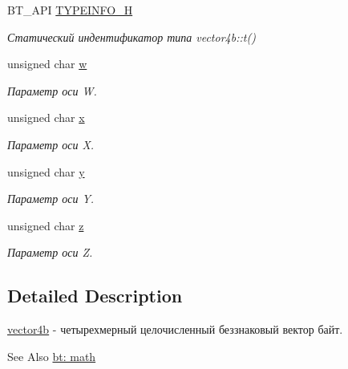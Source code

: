 \begin{DoxyCompactItemize}
\item 
\hypertarget{classbt_1_1vector4b_a838282bb5084c52c344149f52d82e283}{B\-T\-\_\-\-A\-P\-I \hyperlink{classbt_1_1vector4b_a838282bb5084c52c344149f52d82e283}{T\-Y\-P\-E\-I\-N\-F\-O\-\_\-\-H}}\label{classbt_1_1vector4b_a838282bb5084c52c344149f52d82e283}

\begin{DoxyCompactList}\small\item\em Статический индентификатор типа vector4b\-::t() \end{DoxyCompactList}\item 
\hypertarget{classbt_1_1vector4b_aa646332e421c993eef44237df1f3ff94}{unsigned char \hyperlink{classbt_1_1vector4b_aa646332e421c993eef44237df1f3ff94}{w}}\label{classbt_1_1vector4b_aa646332e421c993eef44237df1f3ff94}

\begin{DoxyCompactList}\small\item\em Параметр оси W. \end{DoxyCompactList}\item 
\hypertarget{classbt_1_1vector4b_adc8ba763a40e3ee0acccf7f94abe6e8d}{unsigned char \hyperlink{classbt_1_1vector4b_adc8ba763a40e3ee0acccf7f94abe6e8d}{x}}\label{classbt_1_1vector4b_adc8ba763a40e3ee0acccf7f94abe6e8d}

\begin{DoxyCompactList}\small\item\em Параметр оси X. \end{DoxyCompactList}\item 
\hypertarget{classbt_1_1vector4b_ae9238baf2e3a438b95c7a120e2d5c83b}{unsigned char \hyperlink{classbt_1_1vector4b_ae9238baf2e3a438b95c7a120e2d5c83b}{y}}\label{classbt_1_1vector4b_ae9238baf2e3a438b95c7a120e2d5c83b}

\begin{DoxyCompactList}\small\item\em Параметр оси Y. \end{DoxyCompactList}\item 
\hypertarget{classbt_1_1vector4b_a2bc698541bbd3417e40363625a41bbc7}{unsigned char \hyperlink{classbt_1_1vector4b_a2bc698541bbd3417e40363625a41bbc7}{z}}\label{classbt_1_1vector4b_a2bc698541bbd3417e40363625a41bbc7}

\begin{DoxyCompactList}\small\item\em Параметр оси Z. \end{DoxyCompactList}\end{DoxyCompactItemize}


\subsection{Detailed Description}
\hyperlink{classbt_1_1vector4b}{vector4b} -\/ четырехмерный целочисленный беззнаковый вектор байт. 

\begin{DoxySeeAlso}{See Also}
\hyperlink{group__math}{bt\-: math} 
\end{DoxySeeAlso}
